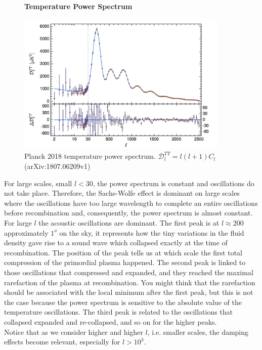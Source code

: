 \documentclass{article}
\begin{document}
\begin{figure}
\centering
\textbf{Temperature Power Spectrum}\par\medskip
\centering
\includegraphics[width=0.9\textwidth]{planck2018}
\caption{Planck 2018 temperature power spectrum. $\mathcal{D}^{TT}_l = l(l+1)C_l$ (arXiv:1807.06209v1)}
\label{temp_pow_spect}
\end{figure}
%
%
%
For large scales, small $l<30$, the power spectrum is constant and oscillations do not take place.
Therefore, the Sachs-Wolfe effect is dominant on large scales where the oscillations have too large wavelength to complete an entire oscillations before recombination and, consequently, the power spectrum is almost constant.\\
For large $l$ the acoustic oscillations are dominant.
The first peak is at $l \approx 200$ approximately $1 ^o$ on the sky, it represents how the tiny variations in the fluid density gave rise to a sound wave which collapsed exactly at the time of recombination.
The position of the peak tells us at which scale the first total compression of the primordial plasma happened.
The second peak is linked to those oscillations that compressed and expanded, and they reached the maximal rarefaction of the plasma at recombination.
You might think that the rarefaction should be associated with the local minimum after the first peak, but this is not the case because the power spectrum is sensitive to the absolute value of the temperature oscillations.
The third peak is related to the oscillations that collapsed expanded and re-collapsed, and so on for the higher peaks.\\
Notice that as we consider higher and higher $l$, i.e. smaller scales, the damping effects become relevant, especially for  $l>10^{3}$.\\
\end{document}
